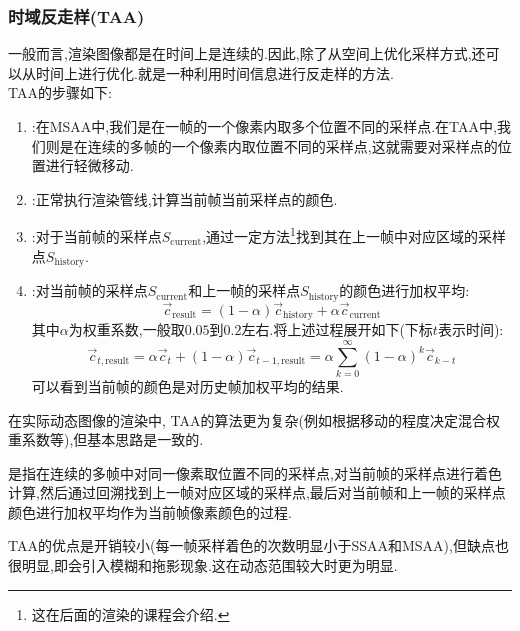 \documentclass{ctexart}
\begin{document}
\subsubsection{时域反走样(TAA)}
一般而言,渲染图像都是在时间上是连续的.因此,除了从空间上优化采样方式,还可以从时间上进行优化.就是一种利用时间信息进行反走样的方法.\\
\indent TAA的步骤如下:
\begin{enumerate}[label=\tbf{\arabic*}.,topsep=0pt,parsep=0pt,itemsep=0pt,partopsep=0pt]
    \item {}:在MSAA中,我们是在一帧的一个像素内取多个位置不同的采样点.在TAA中,我们则是在连续的多帧的一个像素内取位置不同的采样点,这就需要对采样点的位置进行轻微移动.
    \item {}:正常执行渲染管线,计算当前帧当前采样点的颜色.
    \item {}:对于当前帧的采样点$S_{\text{current}}$,通过一定方法\footnote{这在后面的渲染的课程会介绍.}找到其在上一帧中对应区域的采样点$S_{\text{history}}$.
    \item {}:对当前帧的采样点$S_{\text{current}}$和上一帧的采样点$S_{\text{history}}$的颜色进行加权平均:
        \[\vec{c}_{\text{result}}=(1-\alpha)\vec{c}_{\text{history}}+\alpha\vec{c}_{\text{current}}\]
        其中$\alpha$为权重系数,一般取$0.05$到$0.2$左右.将上述过程展开如下(下标$t$表示时间):
        \[\vec{c}_{t,\text{result}}=\alpha\vec{c}_{t}+(1-\alpha)\vec{c}_{t-1,\text{result}}=\alpha\sum_{k=0}^{\infty}(1-\alpha)^k\vec{c}_{k-t}\]
        可以看到当前帧的颜色是对历史帧加权平均的结果.
\end{enumerate}
在实际动态图像的渲染中, TAA的算法更为复杂(例如根据移动的程度决定混合权重系数等),但基本思路是一致的.
\begin{definition}[TAA]
    是指在连续的多帧中对同一像素取位置不同的采样点,对当前帧的采样点进行着色计算,然后通过回溯找到上一帧对应区域的采样点,最后对当前帧和上一帧的采样点颜色进行加权平均作为当前帧像素颜色的过程.
\end{definition}
TAA的优点是开销较小(每一帧采样着色的次数明显小于SSAA和MSAA),但缺点也很明显,即会引入模糊和拖影现象.这在动态范围较大时更为明显.
\end{document}
